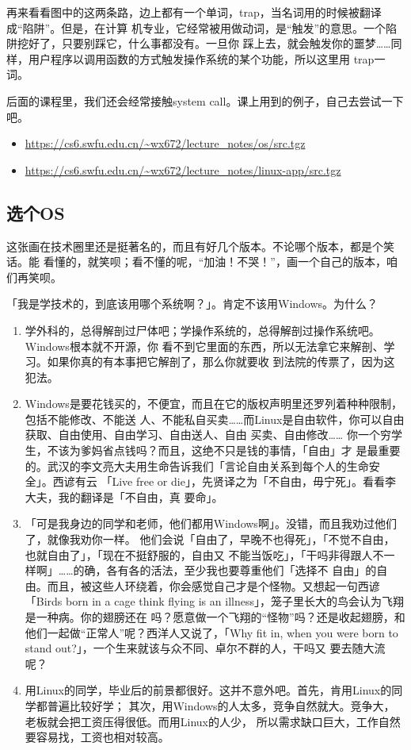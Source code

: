 \documentclass{wx672ctexart}
\newcommand\mpic[1]{%
  \marginpar{\texttt{[image: thumbnails/\#1]}}}
\begin{document}
再来看看图中的这两条路，边上都有一个单词，trap，当名词用的时候被翻译成“陷阱”。但是，在计算
机专业，它经常被用做动词，是“触发”的意思。一个陷阱挖好了，只要别踩它，什么事都没有。一旦你
踩上去，就会触发你的噩梦……同样，用户程序以调用函数的方式触发操作系统的某个功能，所以这里用
trap一词。

后面的课程里，我们还会经常接触system call。课上用到的例子，自己去尝试一下吧。
\begin{itemize}
\item \url{https://cs6.swfu.edu.cn/\~wx672/lecture\_notes/os/src.tgz}
\item \url{https://cs6.swfu.edu.cn/\~wx672/lecture\_notes/linux-app/src.tgz}
\end{itemize}

\subsection{选个OS}
\label{sec:org50cf3aa}

\mpic{pg_0009}这张画在技术圈里还是挺著名的，而且有好几个版本。不论哪个版本，都是个笑话。能
看懂的，就笑呗；看不懂的呢，“加油！不哭！”，画一个自己的版本，咱们再笑呗。

「我是学技术的，到底该用哪个系统啊？」。肯定不该用Windows。为什么？
\begin{enumerate}
\item 学外科的，总得解剖过尸体吧；学操作系统的，总得解剖过操作系统吧。Windows根本就不开源，你
看不到它里面的东西，所以无法拿它来解剖、学习。如果你真的有本事把它解剖了，那么你就要收
到法院的传票了，因为这犯法。
\item Windows是要花钱买的，不便宜，而且在它的版权声明里还罗列着种种限制，包括不能修改、不能送
人、不能私自买卖……而Linux是自由软件，你可以自由获取、自由使用、自由学习、自由送人、自由
买卖、自由修改…… 你一个穷学生，不该为爹妈省点钱吗？而且，这绝不只是钱的事情，「自由」才
是最重要的。武汉的李文亮大夫用生命告诉我们「言论自由关系到每个人的生命安全」。西谚有云
「Live free or die」，先贤译之为「不自由，毋宁死」。看看李大夫，我的翻译是「不自由，真
要命」。
\item 「可是我身边的同学和老师，他们都用Windows啊」。没错，而且我劝过他们了，就像我劝你一样。
他们会说「自由了，早晚不也得死」，「不觉不自由，也就自由了」，「现在不挺舒服的，自由又
不能当饭吃」，「干吗非得跟人不一样啊」……的确，各有各的活法，至少我也要尊重他们「选择不
自由」的自由。而且，被这些人环绕着，你会感觉自己才是个怪物。又想起一句西谚「Birds born
in a cage think flying is an illness」，笼子里长大的鸟会认为飞翔是一种病。你的翅膀还在
吗？愿意做一个飞翔的“怪物”吗？还是收起翅膀，和他们一起做“正常人”呢？西洋人又说了，「Why
fit in, when you were born to stand out?」，一个生来就该与众不同、卓尔不群的人，干吗又
要去随大流呢？
\item 用Linux的同学，毕业后的前景都很好。这并不意外吧。首先，肯用Linux的同学都普遍比较好学；
其次，用Windows的人太多，竞争自然就大。竞争大，老板就会把工资压得很低。而用Linux的人少，
所以需求缺口巨大，工作自然要容易找，工资也相对较高。
\end{enumerate}
\end{document}
